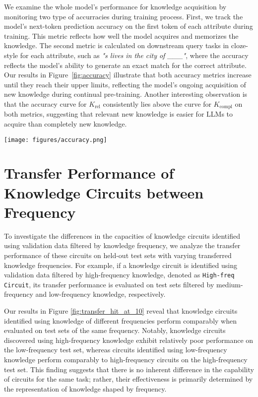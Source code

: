 We examine the whole model's performance for knowledge acquisition by monitoring two type of accurracies during training process.
First, we track the model's next-token prediction accuracy on the first token of each attribute during training.
This metric reflects how well the model acquires and memorizes the knowledge.
The second metric is calculated on downstream query tasks in cloze-style for each attribute, such as \textit{"s lives in the city of \_\_\_"}, where the accuracy reflects the model's ability to generate an exact match for the correct attribute.
Our results in Figure~\ref{fig:accuracy} illustrate that both accuracy metrics increase until they reach their upper limits, reflecting the model's ongoing acquisition of new knowledge during continual pre-training.
Another interesting observation is that the accuracy curve for $K_\text{rel}$ consistently lies above the curve for $K_\text{compl}$ on both metrics, suggesting that relevant new knowledge is easier for LLMs to acquire than completely new knowledge.

\begin{figure*}
    \centering
    \texttt{[image: figures/accuracy.png]}
    \caption{Accuracy curves across continual pre-training. \texttt{K\_rel} and \texttt{K\_compl} represent relevant new knowledge and completely new knowledge, respectively. \texttt{First-token Acc} stands for the model's next-token prediction accuracy on the first token of each attribute, while \texttt{Query Acc} stands for the generation accuracy on downstream query tasks for each attribute.}
    \label{fig:accuracy}
\end{figure*}

\section{Transfer Performance of Knowledge Circuits between Frequency}
\label{app:transfer_setting}
To investigate the differences in the capacities of knowledge circuits identified using validation data filtered by knowledge frequency, we analyze the transfer performance of these circuits on held-out test sets with varying transferred knowledge frequencies.
For example, if a knowledge circuit is identified using validation data filtered by high-frequency knowledge, denoted as \texttt{High-freq Circuit}, its transfer performance is evaluated on test sets filtered by medium-frequency and low-frequency knowledge, respectively.

Our results in Figure \ref{fig:transfer_hit_at_10} reveal that knowledge circuits identified using knowledge of different frequencies perform comparably when evaluated on test sets of the same frequency. Notably, knowledge circuits discovered using high-frequency knowledge exhibit relatively poor performance on the low-frequency test set, whereas circuits identified using low-frequency knowledge perform comparably to high-frequency circuits on the high-frequency test set. This finding suggests that there is no inherent difference in the capability of circuits for the same task; rather, their effectiveness is primarily determined by the representation of knowledge shaped by frequency.



